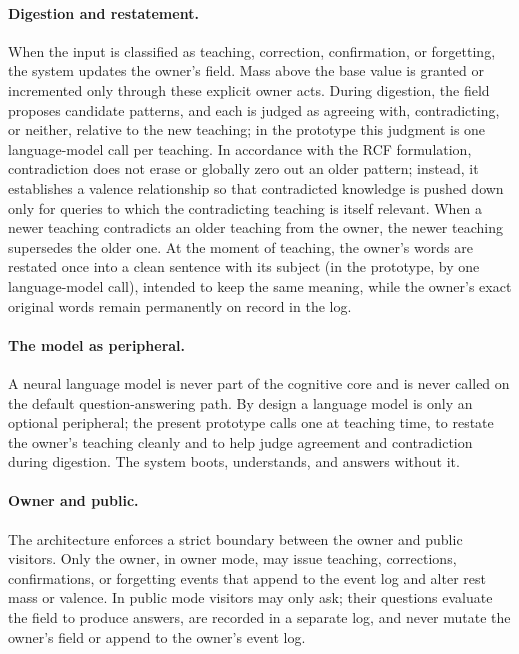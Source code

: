 \documentclass[11pt]{article}
\theoremstyle{remark}
\begin{document}
\paragraph{Digestion and restatement.}
When the input is classified as teaching, correction, confirmation, or forgetting, the system updates the owner's field. Mass above the base value is granted or incremented only through these explicit owner acts. During digestion, the field proposes candidate patterns, and each is judged as agreeing with, contradicting, or neither, relative to the new teaching; in the prototype this judgment is one language-model call per teaching. In accordance with the RCF formulation, contradiction does not erase or globally zero out an older pattern; instead, it establishes a valence relationship so that contradicted knowledge is pushed down only for queries to which the contradicting teaching is itself relevant. When a newer teaching contradicts an older teaching from the owner, the newer teaching supersedes the older one. At the moment of teaching, the owner's words are restated once into a clean sentence with its subject (in the prototype, by one language-model call), intended to keep the same meaning, while the owner's exact original words remain permanently on record in the log.

\paragraph{The model as peripheral.}
A neural language model is never part of the cognitive core and is never called on the default question-answering path. By design a language model is only an optional peripheral; the present prototype calls one at teaching time, to restate the owner's teaching cleanly and to help judge agreement and contradiction during digestion. The system boots, understands, and answers without it.

\paragraph{Owner and public.}
The architecture enforces a strict boundary between the owner and public visitors. Only the owner, in owner mode, may issue teaching, corrections, confirmations, or forgetting events that append to the event log and alter rest mass or valence. In public mode visitors may only ask; their questions evaluate the field to produce answers, are recorded in a separate log, and never mutate the owner's field or append to the owner's event log.
\end{document}
